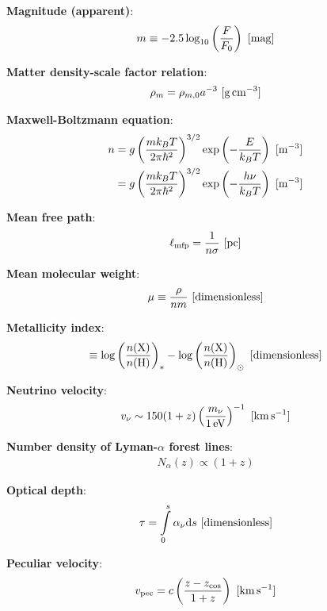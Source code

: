 \documentclass[a4paper,11pt]{article}
\begin{document}
{\noindent}\textbf{Magnitude (apparent)}:
\begin{align*}
    m \equiv -2.5\log_{10}\left(\frac{F}{F_0}\right) ~ [{\rm mag}]
\end{align*}

{\noindent}\textbf{Matter density-scale factor relation}:
\begin{align*}
    \rho_m = \rho_{m,0}a^{-3} ~ [{\rm g\,cm^{-3}}]
\end{align*}

{\noindent}\textbf{Maxwell-Boltzmann equation}:
\begin{align*}
    n &= g\left(\frac{mk_BT}{2\pi\hbar^2}\right)^{3/2}\exp\left(-\frac{E}{k_BT}\right) ~ [{\rm m^{-3}}] \\
    &= g\left(\frac{mk_BT}{2\pi\hbar^2}\right)^{3/2}\exp\left(-\frac{h\nu}{k_BT}\right) ~ [{\rm m^{-3}}]
\end{align*}

{\noindent}\textbf{Mean free path}:
\begin{align*}
    \ell_\mathrm{mfp} = \dfrac{1}{n\sigma} ~ [{\rm pc}]
\end{align*}

{\noindent}\textbf{Mean molecular weight}:
\begin{align*}
    \mu \equiv \frac{\rho}{nm} ~ [{\rm dimensionless}]
\end{align*}

{\noindent}\textbf{Metallicity index}:
\begin{align*}
    [\mathrm{X}/\mathrm{H}] \equiv \log\left(\frac{n(\mathrm{X})}{n(\mathrm{H})}\right)_* -\log\left(\frac{n(\mathrm{X})}{n(\mathrm{H})}\right)_\odot ~ [{\rm dimensionless}]
\end{align*}

{\noindent}\textbf{Neutrino velocity}:
\begin{align*}
    v_\nu \sim 150(1+z)\left(\frac{m_\nu}{1\,{\rm eV}}\right)^{-1} ~ [{\rm km\,s^{-1}}]
\end{align*}

{\noindent}\textbf{Number density of Lyman-$\alpha$ forest lines}:
\begin{align*}
    N_\alpha(z) \propto (1+z)
\end{align*}

{\noindent}\textbf{Optical depth}:
\begin{align*}
    \tau = \int\limits_0^s \alpha_\nu\mathrm{d}s ~ [{\rm dimensionless}]
\end{align*}

{\noindent}\textbf{Peculiar velocity}:
\begin{align*}
    v_{\rm pec} = c\left(\frac{z-z_\mathrm{cos}}{1+z}\right) ~ [{\rm km\,s^{-1}}]
\end{align*}
\end{document}
